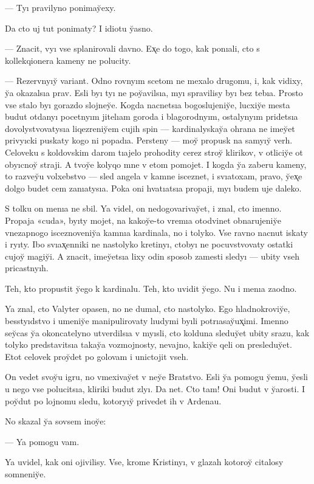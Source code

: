 \documentclass[10pt]{book}
\begin{document}
— Tyı pravilyno ponimay̆exy.

Da cto uj tut ponimaty? I idiotu y̆asno.

— Znacit, vyı vse splanirovali davno. Ex̨e do togo, kak ponıali, cto s kollekqionera kameny ne polucity.

— Rezervnyıy̆ variant. Odno rovnyım scetom ne mexalo drugomu, i, kak vidixy, y̆a okazalsıa prav. Esli byı tyı ne poy̆avilsıa, myı spravilisy byı bez tebıa. Prosto vse stalo byı gorazdo slojney̆e. Kogda nacnetsıa bogoslujeniy̆e, lucxiy̆e mesta budut otdanyı pocetnyım jitelıam goroda i blagorodnyım, ostalynyım pridetsıa dovolystvovatysıa liqezreniy̆em cujih spin — kardinalyskay̆a ohrana ne imey̆et privyıcki puskaty kogo ni popadıa. Persteny — moy̆ propusk na samyıy̆ verh. Celoveku s koldovskim darom tıajelo prohodity cerez stroy̆ klirikov, v otliciy̆e ot obyıcnoy̆ straji. A tvoy̆e kolyqo mne v etom pomojet. I kogda y̆a zaberu kameny, to razvey̆u volxebstvo — sled angela v kamne isceznet, i svıatoxam, pravo, y̆ex̨e dolgo budet cem zanıatysıa. Poka oni hvatıatsıa propaji, myı budem uje daleko.

S tolku on menıa ne sbil. Ya videl, on nedogovarivay̆et, i znal, cto imenno. Propaja «cuda», byıty mojet, na kakoy̆e-to vremıa otodvinet obnarujeniy̆e vnezapnogo isceznoveniy̆a kamnıa kardinala, no i tolyko. Vse ravno nacnut iskaty i ryıty. Ibo svıax̨enniki ne nastolyko kretinyı, ctobyı ne pocuvstvovaty ostatki cujoy̆ magiy̆i. A znacit, imey̆etsıa lixy odin sposob zamesti sledyı — ubity vseh pricastnyıh.

Teh, kto propustit y̆ego k kardinalu. Teh, kto uvidit y̆ego. Nu i menıa zaodno.

Ya znal, cto Valyter opasen, no ne dumal, cto nastolyko. Ego hladnokroviy̆e, besstyıdstvo i umeniy̆e manipulirovaty lıudymi byıli potrıasay̆ux̨imi. Imenno sey̆cas y̆a okoncatelyno utverdilsıa v myısli, cto kolduna sleduy̆et ubity srazu, kak tolyko predstavitsıa takay̆a vozmojnosty, nevajno, kakiy̆e qeli on presleduy̆et. Etot celovek proy̆det po golovam i unictojit vseh.

On vedet svoy̆u igru, no vmexivay̆et v ney̆e Bratstvo. Esli y̆a pomogu y̆emu, y̆esli u nego vse polucitsıa, kliriki budut zlyı. Da net. Cto tam! Oni budut v y̆arosti. I poy̆dut po lojnomu sledu, kotoryıy̆ privedet ih v Ardenau.

No skazal y̆a sovsem inoy̆e:

— Ya pomogu vam.

Ya uvidel, kak oni ojivilisy. Vse, krome Kristinyı, v glazah kotoroy̆ citalosy somneniy̆e.
\end{document}
